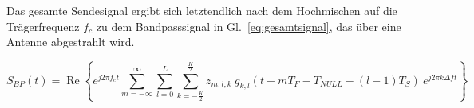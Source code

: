 Das gesamte Sendesignal ergibt sich letztendlich nach dem Hochmischen auf die Trägerfrequenz $f_c$ zu dem Bandpasssignal in Gl.~\ref{eq:gesamtsignal}, das über eine Antenne abgestrahlt wird.

\begin{equation}
S_{BP}(t) = \operatorname{Re} \left\{e^{j2 \pi f_c t} \sum \limits_{m=-\infty}^{\infty} \sum \limits_{l=0}^{L}   \sum \limits_{k=- \frac{K}{2}}^{\frac{K}{2}} z_{m,l,k} \: g_{k,l}(t-mT_F-T_{NULL}-(l-1)T_S) \: e^{j2\pi k \Delta f t}\right\}
\label{eq:gesamtsignal}
\end{equation}